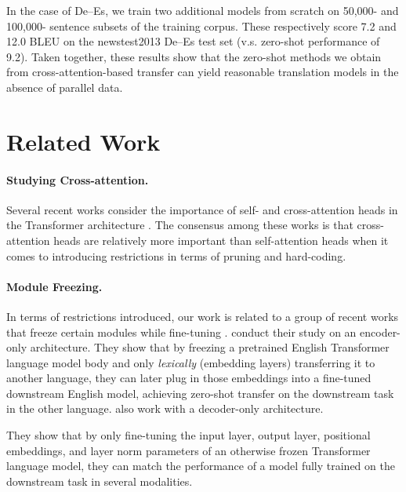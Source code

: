 In the case of De--Es, we train two additional models from scratch on 50,000- and 100,000- sentence subsets of the training corpus. These respectively score 7.2 and 12.0 BLEU on the newstest2013 De--Es test set (v.s. zero-shot performance of 9.2). Taken together, these results show that the zero-shot methods we obtain from cross-attention-based transfer can yield reasonable translation models in the absence of parallel data.

\section{Related Work}

\paragraph{Studying Cross-attention.} Several recent works consider the importance of self- and cross-attention heads in the Transformer architecture \cite{voita-etal-2019-analyzing, NEURIPS2019_2c601ad9, you-etal-2020-hard}. The consensus among these works is that cross-attention heads are relatively more important than self-attention heads when it comes to introducing restrictions in terms of pruning and hard-coding. 

\paragraph{Module Freezing.} In terms of restrictions introduced, our work is related to a group of recent works that freeze certain modules while fine-tuning \cite{zoph-etal-2016-transfer,artetxe-etal-2020-cross,DBLP:journals/corr/abs-2103-05247}.  conduct their study on an encoder-only architecture. They show that by freezing a pretrained English Transformer language model body and only \textit{lexically} (embedding layers) transferring it to another language, they can later plug in those embeddings into a fine-tuned downstream English model, achieving zero-shot transfer on the downstream task in the other language.  also work with a decoder-only architecture.

They show that by only fine-tuning the input layer, output layer, positional embeddings, and layer norm parameters of an otherwise frozen Transformer language model, they can match the performance of a model fully trained on the downstream task in several modalities.

